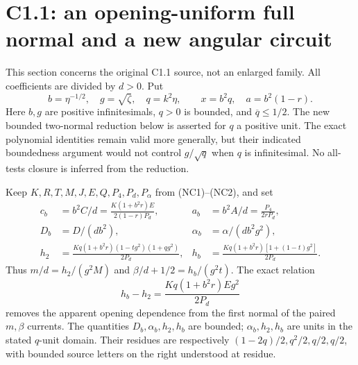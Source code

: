 \section{C1.1: an opening-uniform full normal and a new angular circuit}
\label{sec:r7-c1-small}
This section concerns the original C1.1 source, not an enlarged family.
All coefficients are divided by $d>0$. Put
\[
 b=\eta^{-1/2},\quad g=\sqrt\zeta,\quad q=k^2\eta,
 \qquad x=b^2q,\quad a=b^2(1-r).
 \tag{SC1}
\]
Here $b,g$ are positive infinitesimals, $q>0$ is bounded, and
$\overline q\le1/2$. The new bounded two-normal reduction below is
asserted for $q$ a positive unit. The exact polynomial identities
remain valid more generally, but their indicated boundedness argument
would not control $g/\sqrt q$ when $q$ is infinitesimal.
No all-tests closure is inferred from the reduction.

Keep $K,R,T,M,J,E,Q,P_4,P_d,P_\alpha$ from (NC1)--(NC2), and set
\[
\begin{aligned}
 c_b&=b^2C/d=\frac{K(1+b^2r)E}{2(1-r)P_d},&
 a_b&=b^2A/d=\frac{P_4}{2rP_d},\\
 D_b&=D/(db^2),&\alpha_b&=\alpha/(db^2g^2),\\
 h_2&=\frac{Kq(1+b^2r)(1-tg^2)(1+qg^2)}{2P_d},&
 h_b&=\frac{Kq(1+b^2r)[1+(1-t)g^2]}{2P_d}.
\end{aligned}
\]
Thus $m/d=h_2/(g^2M)$ and $\beta/d+1/2=h_b/(g^2t)$.
The exact relation
\[
 h_b-h_2=\frac{Kq(1+b^2r)E g^2}{2P_d}
 \tag{SC2}
\]
removes the apparent opening dependence from the first normal of the
paired $m,\beta$ currents. The quantities $D_b,\alpha_b,h_2,h_b$ are
bounded; $\alpha_b,h_2,h_b$ are units in the stated $q$-unit domain.
Their residues are respectively $(1-2q)/2,q^2/2,q/2,q/2$, with
bounded source letters on the right understood at residue.

